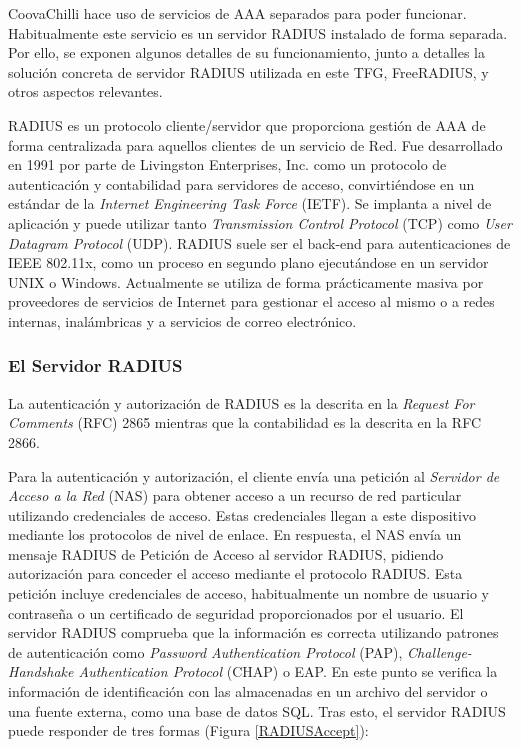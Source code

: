 CoovaChilli hace uso de servicios de \acrshort{AAA} separados para poder funcionar. Habitualmente este servicio es un servidor \acrshort{RADIUS} instalado de forma separada. Por ello, se exponen algunos detalles de su funcionamiento, junto a detalles la solución concreta de servidor \acrshort{RADIUS} utilizada en este TFG, FreeRADIUS, y otros aspectos relevantes.

RADIUS es un protocolo cliente/servidor que proporciona gestión de AAA de forma centralizada para aquellos clientes de un servicio de Red. Fue desarrollado en 1991 por parte de Livingston Enterprises, Inc. como un protocolo de autenticación y contabilidad para servidores de acceso, convirtiéndose en un estándar de la \emph{Internet Engineering Task Force} (\acrshort{IETF}). Se implanta a nivel de aplicación y puede utilizar tanto \emph{Transmission Control Protocol} (\acrshort{TCP}) como \emph{User Datagram Protocol} (\acrshort{UDP}). \acrshort{RADIUS} suele ser el back-end para autenticaciones de \acrshort{IEEE} 802.11x, como un proceso en segundo plano ejecutándose en un servidor UNIX o Windows. Actualmente se utiliza de forma prácticamente masiva por proveedores de servicios de Internet para gestionar el acceso al mismo o a redes internas, inalámbricas y a servicios de correo electrónico.

\subsubsection{El Servidor RADIUS}

La autenticación y autorización de RADIUS es la descrita en la \emph{Request For Comments} (\acrshort{RFC}) 2865 mientras que la contabilidad es la descrita en la \acrshort{RFC} 2866.

Para la autenticación y autorización, el cliente envía una petición al \emph{Servidor de Acceso a la Red} (\acrshort{NAS}) para obtener acceso a un recurso de red particular utilizando credenciales de acceso. Estas credenciales llegan a este dispositivo mediante los protocolos de nivel de enlace. En respuesta, el \acrshort{NAS} envía un mensaje RADIUS de Petición de Acceso al servidor RADIUS, pidiendo autorización para conceder el acceso mediante el protocolo \acrshort{RADIUS}. Esta petición incluye credenciales de acceso, habitualmente un nombre de usuario y contraseña o un certificado de seguridad proporcionados por el usuario. El servidor RADIUS comprueba que la información es correcta utilizando patrones de autenticación como \emph{Password Authentication Protocol} (\acrshort{PAP}), \emph{Challenge-Handshake Authentication Protocol} (\acrshort{CHAP}) o \acrshort{EAP}. En este punto se verifica la información de identificación con las almacenadas en un archivo del servidor o una fuente externa, como una base de datos \acrshort{SQL}. Tras esto, el servidor \acrshort{RADIUS} puede responder de tres formas (Figura \ref{RADIUSAccept}):


